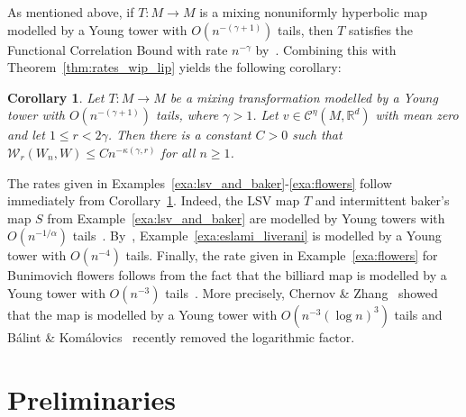 \documentclass[11pt,a4paper,reqno,oneside]{amsart}
\newcommand{\R}{\ensuremath{\mathbb{R}}}%
\newcommand{\holsp}[1][\eta]{\mathcal{C}^{#1}}
\newcommand{\wass}{\mathcal{W}}
\newtheorem{corol}[theorem]{Corollary}
\theoremstyle{definition}
\theoremstyle{remark}
\numberwithin{equation}{section}
\begin{document}
As mentioned above, if $T:M\to M$ is a mixing nonuniformly hyperbolic map modelled by a Young tower with $O(n^{-(\gamma+1)})$ tails, then $T$ satisfies the Functional Correlation Bound with rate $n^{-\gamma}$ by~\cite[Theorem 2.3]{fleming2022}. Combining this with Theorem~\ref{thm:rates_wip_lip} yields the following corollary:
\begin{corol}\label{corol:wip_rates_for_nuh}
    Let $T:M\to M$ be a mixing transformation modelled by a Young tower with $O(n^{-(\gamma+1)})$ tails, where $\gamma>1$. Let $v\in\holsp(M,\R^d) $ with mean zero and let $1\le r<2\gamma$. Then there is a constant $ C>0 $ such that $ \wass_r(W_n,W)\le Cn^{-\kappa(\gamma,r)} $ for all $ n\ge 1 $.
\end{corol}
The rates given in Examples~\ref{exa:lsv_and_baker}-\ref{exa:flowers} follow immediately from Corollary~\ref{corol:wip_rates_for_nuh}. Indeed, the LSV map $T$ and intermittent baker's map $S$ from Example~\ref{exa:lsv_and_baker} are modelled by Young towers with $O(n^{-1/\alpha})$ tails~\cite{young1999recurrence,melbourne_varandas_2016note}.
By~\cite{eslami_liverani}, Example~\ref{exa:eslami_liverani} is modelled by a Young tower with $O(n^{-4})$ tails.
Finally, the rate given in Example~\ref{exa:flowers} for Bunimovich flowers follows from  the fact that the billiard map is modelled by a Young tower with $O(n^{-3})$ tails~\cite{balint_komalovics}. More precisely, Chernov \& Zhang~\cite{chernovzhang2005nonlin} showed that the map is modelled by a Young tower with $O(n^{-3} (\log n)^3)$ tails and B\'alint \& Kom\'alovics~\cite{balint_komalovics} recently removed the logarithmic factor.
	\section{Preliminaries}\label{sec:prelims}
\end{document}
